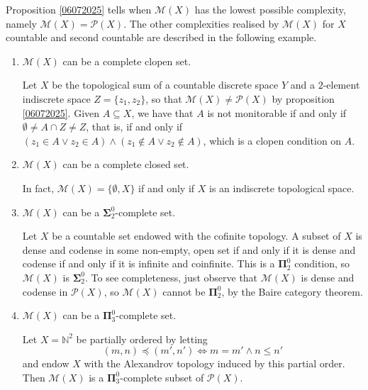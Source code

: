 \documentclass{lmcs}
\newcommand{\N}{\mathbb N}
\newcommand{\bsigma}{\boldsymbol\Sigma}
\newcommand{\bpi}{\boldsymbol\Pi}
\begin{document}
Proposition \ref{06072025} tells when $ \mathcal M(X)$ has the lowest possible complexity, namely $ \mathcal M (X)= \mathcal P (X)$.
The other complexities realised by $ \mathcal M (X)$ for $X$ countable and second countable are described in the following example.

\begin{exa} \label{ex:exmpls}
\begin{enumerate}
\item $ \mathcal M (X)$ can be a complete clopen set.

Let $X$ be the topological sum of a countable discrete space $Y$ and a $2$-element indiscrete space $Z=\{ z_1,z_2\} $, so that $ \mathcal M (X)\ne \mathcal P (X)$ by proposition \ref{06072025}.
Given $A\subseteq X$, we have that $A$ is not monitorable if and only if $\emptyset\ne A\cap Z\ne Z$, that is, if and only if $(z_1\in A\lor z_2\in A)\land (z_1\notin A\lor z_2\notin A)$, which is a clopen condition on $A$.
\item $ \mathcal M (X)$ can be a complete closed set.

In fact, $ \mathcal M (X)=\{\emptyset , X\} $ if and only if $X$ is an indiscrete topological space.
\item $ \mathcal M (X)$ can be a $ \bsigma^0_2$-complete set.

Let $X$ be a countable set endowed with the cofinite topology.
A subset of $X$ is dense and codense in some non-empty, open set if and only if it is dense and codense if and only if it is infinite and coinfinite.
This is a $ \bpi^0_2$ condition, so $ \mathcal M (X)$ is $ \bsigma^0_2$.
To see completeness, just observe that $ \mathcal M (X)$ is dense and codense in $ \mathcal P (X)$, so $ \mathcal M (X)$ cannot be $ \bpi^0_2$, by the Baire category theorem.
\item $ \mathcal M (X)$ can be a $ \bpi^0_3$-complete set.

Let $X= \N^2 $ be partially ordered by letting
\[
(m,n)\preccurlyeq (m',n')\Leftrightarrow m=m'\land n\leqslant n'
\]
and endow $X$ with the Alexandrov topology induced by this partial order.
Then $ \mathcal M (X)$ is a $ \bpi^0_3$-complete subset of $ \mathcal P (X)$.


\end{enumerate}
\end{exa}
\end{document}
